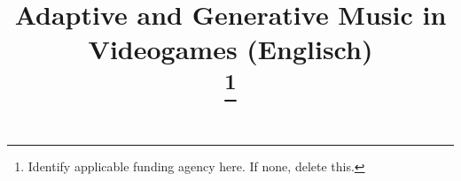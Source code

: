 \documentclass[conference]{IEEEtran}
\begin{document}
\title{Adaptive and Generative
Music in Videogames (Englisch)\\

{\footnotesize \textsuperscript{}}
\thanks{Identify applicable funding agency here. If none, delete this.}
}



\maketitle













\vspace{12pt}
\end{document}
